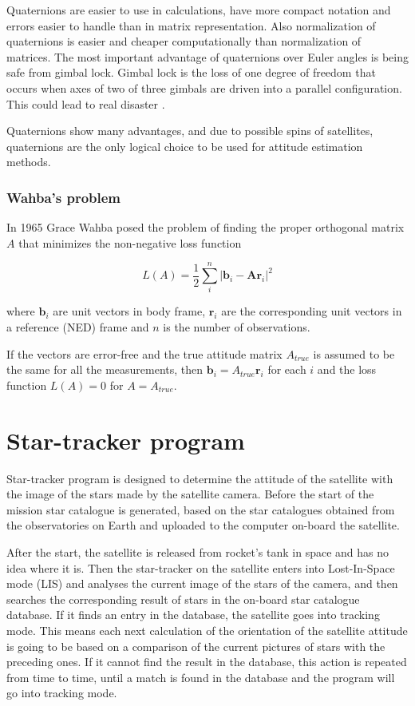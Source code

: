 \documentclass[12pt,a4paper,oneside]{article}
\begin{document}
Quaternions are easier to use in calculations, have more compact notation and errors easier to handle than in matrix representation. Also normalization of quaternions is easier and cheaper computationally than normalization of matrices.
The most important advantage of quaternions over Euler angles is being safe from gimbal lock. Gimbal lock is the loss of one degree of freedom that occurs when axes of two of three gimbals are driven into a parallel configuration. This could lead to real disaster \citet{shoemake1985animating}.

Quaternions show many advantages, and due to possible spins of satellites, quaternions are the only logical choice to be used for attitude estimation methods.

\subsubsection{Wahba's problem}


In 1965 Grace Wahba posed the problem of finding the proper orthogonal matrix $A$ that minimizes the non-negative loss function\cite{wahba1965least}

\begin{equation}
L(A) = \frac{1}{2} \sum_i^n|\bm{b}_i - \bm{Ar}_i|^2
\end{equation}

where $\bm{b}_i$ are unit vectors in body frame, $\bm{r}_i$ are the corresponding unit vectors in a reference (NED) frame and $n$ is the number of observations.

If the vectors are error-free and the true attitude matrix $A_{true}$ is assumed to be the same for all the measurements, then $\bm{b}_i = A_{true}\bm{r}_i$ for each $i$ and the loss function $L(A) = 0$ for $A = A_{true}$.


\newpage
\section{Star-tracker program}

Star-tracker program is designed to determine the attitude of the satellite with the image of the stars made by the satellite camera. Before the start of the mission star catalogue is generated, based on the star catalogues obtained from the observatories on Earth and uploaded to the computer on-board the satellite. 

After the start, the satellite is released from rocket's tank in space and has no idea where it is. Then the star-tracker on the satellite enters into Lost-In-Space mode (LIS) and analyses the current image of the stars of the camera, and then searches the corresponding result of stars in the on-board star catalogue database. If it finds an entry in the database, the satellite goes into tracking mode. This means each next calculation of the orientation of the satellite attitude is going to be based on a comparison of the current pictures of stars with the preceding ones. If it cannot find the result in the database, this action is repeated from time to time, until a match is found in the database and the program will go into tracking mode.
\end{document}
